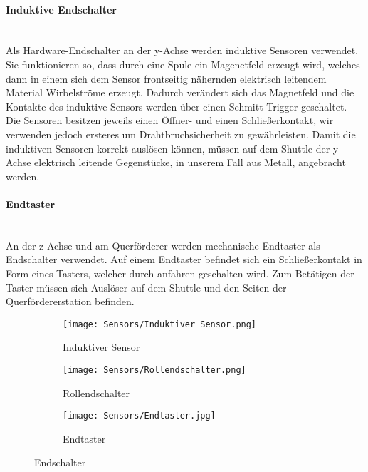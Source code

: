 \paragraph{Induktive Endschalter} \mbox{}\\
Als Hardware-Endschalter an der y-Achse werden induktive Sensoren verwendet. Sie funktionieren so, dass durch eine Spule ein Magenetfeld erzeugt wird, welches dann in einem sich dem Sensor frontseitig nähernden elektrisch leitendem Material Wirbelströme erzeugt. Dadurch verändert sich das Magnetfeld und die Kontakte des induktive Sensors werden über einen Schmitt-Trigger geschaltet. Die Sensoren besitzen jeweils einen Öffner- und einen Schließerkontakt, wir verwenden jedoch ersteres um Drahtbruchsicherheit zu gewährleisten. Damit die induktiven Sensoren korrekt auslösen können, müssen auf dem Shuttle der y-Achse elektrisch leitende Gegenstücke, in unserem Fall aus Metall, angebracht werden.

\paragraph{Endtaster} \mbox{}\\
An der z-Achse und am Querförderer werden mechanische Endtaster als Endschalter verwendet. Auf einem Endtaster befindet sich ein Schließerkontakt in Form eines Tasters, welcher durch anfahren geschalten wird. Zum Betätigen der Taster müssen sich Auslöser auf dem Shuttle und den Seiten der Querfördererstation befinden.

\begin{figure}[H]
    \centering
    \begin{subfigure}{.3\textwidth}
        \centering
        \texttt{[image: Sensors/Induktiver\_Sensor.png]}
        \caption{Induktiver Sensor \cite{induktiv_sensor}}
        \label{ulr:dorn}
    \end{subfigure}%
    \begin{subfigure}{.3\textwidth}
        \centering
        \texttt{[image: Sensors/Rollendschalter.png]}
        \caption{Rollendschalter \cite{schmersal_pic}}
        \label{ulr:f1}
    \end{subfigure}%
    \begin{subfigure}{.3\textwidth}
        \centering
        \texttt{[image: Sensors/Endtaster.jpg]}
        \caption{Endtaster}
        \label{ulr:f2}
    \end{subfigure}
    \caption{Endschalter}
    \label{ulr}
\end{figure}

